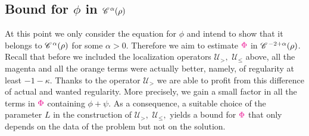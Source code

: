 \documentclass[a4paper,11pt]{article}
\numberwithin{equation}{section}
\newcommand{\CC}{\mathscr{C} \hspace{.1em}}
\newcommand{\UU}{\mathscr{U}}
\newcommand{\rmm}[1]{\textcolor{magenta}{#1}}
\newcommand{\8}{\infty}
\begin{document}
\subsection{Bound for $\phi$ in $\CC^\alpha(\rho)$}
\label{ssec:phi1}

At this point we only consider the equation for $\phi$ and intend to show that it belongs to $\CC^{\alpha}(\rho)$ for some $\alpha>0$.
Therefore we aim to estimate $\rmm{\Phi}$ in $\CC^{-2+\alpha}(\rho)$. Recall that before we included the localization operators $\UU_>,$ $\UU_\leqslant$ above, all the magenta and all the orange terms were actually better, namely, of regularity at least $-1-\kappa$. Thanks to the operator $\UU_>$ we are able to profit from this difference of actual and wanted regularity. More precisely, we gain a small factor in all the terms in $\rmm{\Phi}$ containing $\phi+\psi$. As a consequence, a suitable choice of the parameter $L$ in the construction of $\UU_>,$ $\UU_\leqslant,$ yields  a bound for $\rmm{\Phi}$ that only depends on the data of the problem but not on the solution. 
\end{document}
